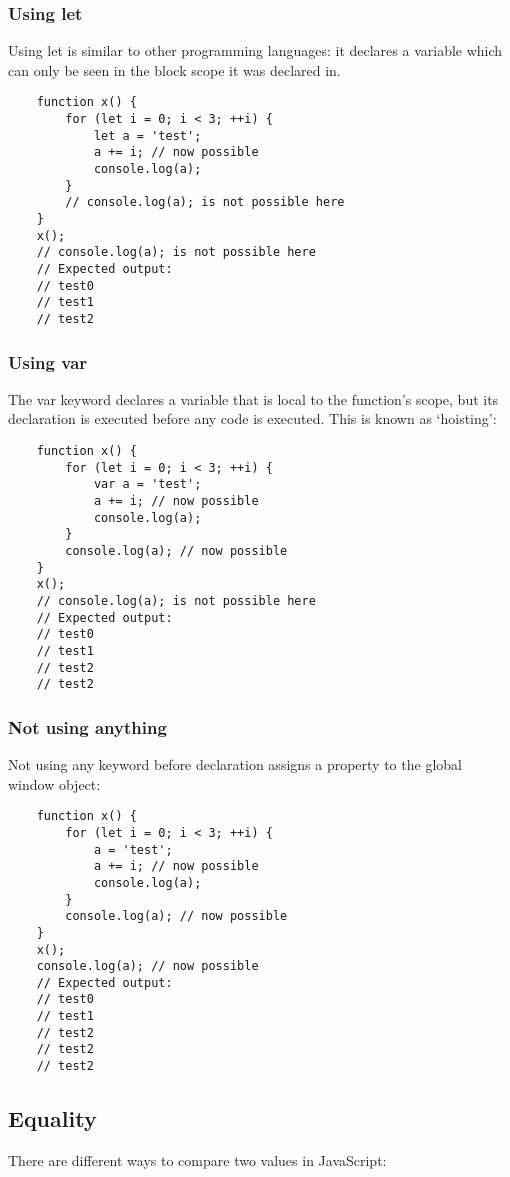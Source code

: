 \documentclass[11pt,a4paper]{article}
\begin{document}
\subsubsection{Using let}
Using let is similar to other programming languages:
it declares a variable which can only be seen in the block scope it was declared in.
\begin{verbatim}
    function x() {
        for (let i = 0; i < 3; ++i) {
            let a = 'test';
            a += i; // now possible
            console.log(a);
        }
        // console.log(a); is not possible here
    }
    x();
    // console.log(a); is not possible here
    // Expected output:
    // test0
    // test1
    // test2
\end{verbatim}

\subsubsection{Using var}
The var keyword declares a variable that is local to the function's scope,
but its declaration is executed before any code is executed.
This is known as `hoisting':
\begin{verbatim}
    function x() {
        for (let i = 0; i < 3; ++i) {
            var a = 'test';
            a += i; // now possible
            console.log(a);
        }
        console.log(a); // now possible
    }
    x();
    // console.log(a); is not possible here
    // Expected output:
    // test0
    // test1
    // test2
    // test2
\end{verbatim}

\subsubsection{Not using anything}
Not using any keyword before declaration assigns a property to the global window object:
\begin{verbatim}
    function x() {
        for (let i = 0; i < 3; ++i) {
            a = 'test';
            a += i; // now possible
            console.log(a);
        }
        console.log(a); // now possible
    }
    x();
    console.log(a); // now possible
    // Expected output:
    // test0
    // test1
    // test2
    // test2
    // test2
\end{verbatim}

\subsection{Equality}
There are different ways to compare two values in JavaScript:
\end{document}
